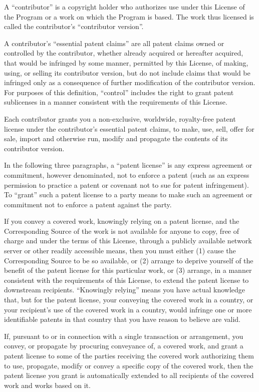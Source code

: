 \documentclass[a4paper, 11pt, twoside]{article}
\begin{document}
A “contributor” is a copyright holder who authorizes use under this License of the Program or a work on which the Program is based. The work thus licensed is called the contributor's “contributor version”.

A contributor's “essential patent claims” are all patent claims owned or controlled by the contributor, whether already acquired or hereafter acquired, that would be infringed by some manner, permitted by this License, of making, using, or selling its contributor version, but do not include claims that would be infringed only as a consequence of further modification of the contributor version. For purposes of this definition, “control” includes the right to grant patent sublicenses in a manner consistent with the requirements of this License.

Each contributor grants you a non-exclusive, worldwide, royalty-free patent license under the contributor's essential patent claims, to make, use, sell, offer for sale, import and otherwise run, modify and propagate the contents of its contributor version.

In the following three paragraphs, a “patent license” is any express agreement or commitment, however denominated, not to enforce a patent (such as an express permission to practice a patent or covenant not to sue for patent infringement). To “grant” such a patent license to a party means to make such an agreement or commitment not to enforce a patent against the party.

If you convey a covered work, knowingly relying on a patent license, and the Corresponding Source of the work is not available for anyone to copy, free of charge and under the terms of this License, through a publicly available network server or other readily accessible means, then you must either (1) cause the Corresponding Source to be so available, or (2) arrange to deprive yourself of the benefit of the patent license for this particular work, or (3) arrange, in a manner consistent with the requirements of this License, to extend the patent license to downstream recipients. “Knowingly relying” means you have actual knowledge that, but for the patent license, your conveying the covered work in a country, or your recipient's use of the covered work in a country, would infringe one or more identifiable patents in that country that you have reason to believe are valid.

If, pursuant to or in connection with a single transaction or arrangement, you convey, or propagate by procuring conveyance of, a covered work, and grant a patent license to some of the parties receiving the covered work authorizing them to use, propagate, modify or convey a specific copy of the covered work, then the patent license you grant is automatically extended to all recipients of the covered work and works based on it.
\end{document}
